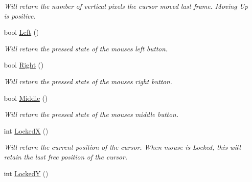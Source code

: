 \begin{DoxyCompactItemize}
\begin{DoxyCompactList}\small\item\em Will return the number of vertical pixels the cursor moved last frame. Moving Up is positive. \end{DoxyCompactList}\item 
\hypertarget{classc_mouse_a0f6cd75cafc7c7ff7f00947e2f98b092}{
bool \hyperlink{classc_mouse_a0f6cd75cafc7c7ff7f00947e2f98b092}{Left} ()}
\label{classc_mouse_a0f6cd75cafc7c7ff7f00947e2f98b092}

\begin{DoxyCompactList}\small\item\em Will return the pressed state of the mouses left button. \end{DoxyCompactList}\item 
\hypertarget{classc_mouse_a4d84d97d051d920a476e5b300fc38396}{
bool \hyperlink{classc_mouse_a4d84d97d051d920a476e5b300fc38396}{Right} ()}
\label{classc_mouse_a4d84d97d051d920a476e5b300fc38396}

\begin{DoxyCompactList}\small\item\em Will return the pressed state of the mouses right button. \end{DoxyCompactList}\item 
\hypertarget{classc_mouse_ae372f0b8e20928233060adc9a7450a93}{
bool \hyperlink{classc_mouse_ae372f0b8e20928233060adc9a7450a93}{Middle} ()}
\label{classc_mouse_ae372f0b8e20928233060adc9a7450a93}

\begin{DoxyCompactList}\small\item\em Will return the pressed state of the mouses middle button. \end{DoxyCompactList}\item 
\hypertarget{classc_mouse_ac254966f9f860197e4e581066775af74}{
int \hyperlink{classc_mouse_ac254966f9f860197e4e581066775af74}{LockedX} ()}
\label{classc_mouse_ac254966f9f860197e4e581066775af74}

\begin{DoxyCompactList}\small\item\em Will return the current position of the cursor. When mouse is Locked, this will retain the last free position of the cursor. \end{DoxyCompactList}\item 
\hypertarget{classc_mouse_a52df381bb54181ee574fcf4649353b52}{
int \hyperlink{classc_mouse_a52df381bb54181ee574fcf4649353b52}{LockedY} ()}
\label{classc_mouse_a52df381bb54181ee574fcf4649353b52}


\end{DoxyCompactItemize}
